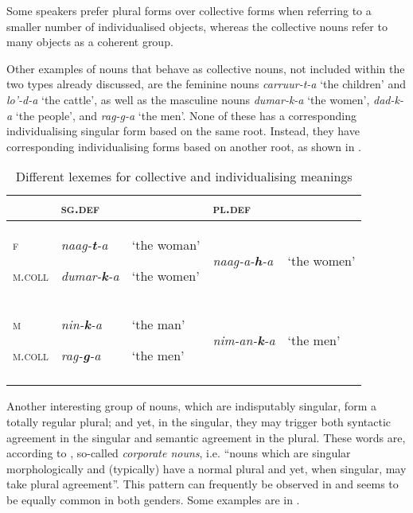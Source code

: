 \documentclass[output=paper]{langsci/langscibook}
\begin{document}
  
Some speakers prefer plural forms over collective forms when referring to a smaller number of individualised objects, whereas the collective nouns refer to many objects as a coherent group. 

Other examples of nouns that behave as collective nouns, not included within the two types already discussed, are the feminine nouns \textit{carruur-t-a} ‘the children’ and \textit{lo’-d-a} ‘the cattle’, as well as the masculine nouns \textit{dumar-k-a} ‘the women’, \textit{dad-k-a} ‘the people’, and \textit{rag-g-a} ‘the men’. None of these has a corresponding individualising singular form based on the same root. Instead, they have corresponding individualising forms based on another root, as shown in .


\begin{table}
\caption{Different lexemes for collective and individualising meanings}
\label{tab:nilsson:13}
\begin{tabularx}{\textwidth}{XXXXX} 
\lsptoprule
& {\textsc{sg.def}} &  & {\textsc{pl.def}} & \\
\midrule
{\textsc{f}}

{\textsc{m.coll}} & {\textit{naag-}\textbf{\textit{t}}\textit{-a}}

{\textit{dumar-}\textbf{\textit{k}}\textit{-a}} & {‘the woman’}

{‘the women’} & {\textit{naag-a-}\textbf{\textit{h}}\textit{-a}} & {‘the women’}\\
{\textsc{m}}

{\textsc{m.coll}} & {\textit{nin-}\textbf{\textit{k}}\textit{-a}}

{\textit{rag-}\textbf{\textit{g}}\textit{-a}} & {‘the man’}

{‘the men’} & {\textit{nim-an-}\textbf{\textit{k}}\textit{-a}} & {‘the men’}\\
\lspbottomrule
\end{tabularx}

\end{table} 



Another interesting group of  nouns, which are indisputably singular, form a totally regular plural; and yet, in the singular, they may trigger both syntactic agreement in the singular and semantic agreement in the plural. These words are, according to \citet[188]{Corbett2000}, so-called \textit{corporate nouns}, i.e. “nouns which are singular morphologically and (typically) have a normal plural and yet, when singular, may take plural agreement”. This pattern can frequently be observed in  and seems to be equally common in both genders. Some examples are in .
 
\end{document}
